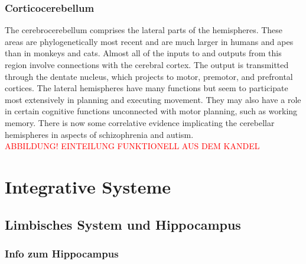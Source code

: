 \documentclass[12pt,a4paper,pdftex]{article}
\begin{document}
\subsubsection*{Corticocerebellum}
The cerebrocerebellum comprises the lateral parts of the hemispheres. These areas are phylogenetically most recent and are much larger in humans and apes than in monkeys and cats. Almost all of the inputs to and outputs from this region involve connections with the cerebral cortex. The output is transmitted through the dentate nucleus, which projects to motor, premotor, and prefrontal cortices. The lateral hemispheres have many functions but seem to participate most extensively in planning and executing movement. They may also have a role in certain cognitive functions unconnected with motor planning, such as working memory. There is now some correlative evidence implicating the cerebellar hemispheres in aspects of schizophrenia and autism. \\

\textcolor{red}{ABBILDUNG! EINTEILUNG FUNKTIONELL AUS DEM KANDEL}

\newpage
\section{Integrative Systeme} \label{sec:integrative_systeme}
\subsection{Limbisches System und Hippocampus} \label{subsec:limisches_system}

\subsubsection*{Info zum Hippocampus}
\end{document}
